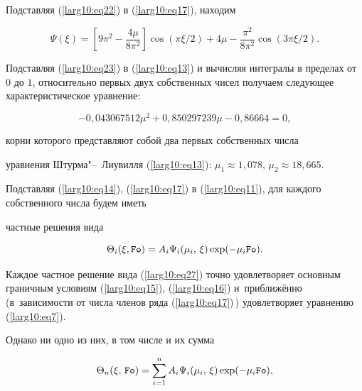 Подставляя (\ref{larg10:eq22}) в (\ref{larg10:eq17}), находим

\begin{equation}

\label{larg10:eq23}

\Psi(\xi )=\left[ 9 \pi^2 - \frac{4 \mu}{8\pi^2} \right] \cos \left({\pi \xi }/{2}\right) + 4 \mu - \frac{\pi ^2}{8\pi ^2}

\cos \left( {3\pi \xi }/{2}\right).

\end{equation}

Подставляя (\ref{larg10:eq23}) в (\ref{larg10:eq13}) и вычисляя интегралы в пределах от $0$ до $1$, относительно первых двух собственных чисел получаем следующее характеристическое уравнение:

\begin{equation}

\label{larg10:eq24}

-0{,}043067512 \mu^2 + 0{,}850297239 \mu -0{,}86664=0,

\end{equation}

корни которого представляют собой два первых собственных числа

уравнения Штурма"--~Лиувилля (\ref{larg10:eq13}): $\mu _1 \approx 1,078$, $\mu_2 \approx 18,665$.





Подставляя (\ref{larg10:eq14}), (\ref{larg10:eq17}) в (\ref{larg10:eq11}), для каждого собственного числа будем иметь

частные решения вида

\begin{equation}

\label{larg10:eq27}

\Theta_i (\xi, {\tt Fo})=A_i \Psi_i (\mu_i,\,\xi)\exp (-\mu_i {\tt Fo}).

\end{equation}



Каждое частное решение вида (\ref{larg10:eq27}) точно удовлетворяет основным граничным условиям (\ref{larg10:eq15}), (\ref{larg10:eq16}) и~приближённо (в~зависимости от числа членов ряда (\ref{larg10:eq17})\,) удовлетворяет уравнению (\ref{larg10:eq7}). 

Однако ни одно из них, в том числе и их сумма

\begin{equation}

\label{larg10:eq28}

\Theta_n (\xi ,\,{\tt Fo})=\sum \limits_{i=1}^n A_i \Psi_i (\mu_i,\,\xi ) \exp (-\mu_i {\tt Fo}),

\end{equation}

